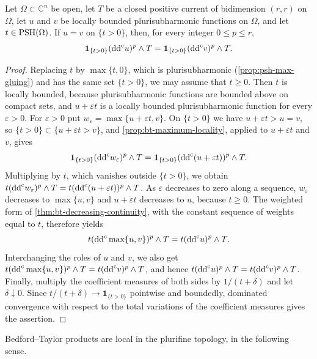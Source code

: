\begin{lemma}\label{lem:bt-superlevel-locality}
Let $\Omega\subset\mathbb C^n$ be open, let $T$ be a closed positive current of bidimension $(r,r)$ on $\Omega$, let $u$ and $v$ be locally bounded plurisubharmonic functions on $\Omega$, and let $t\in\mathrm{PSH}(\Omega)$. If $u=v$ on $\{t>0\}$, then, for every integer $0\le p\le r$,
\[
 \mathbf1_{\{t>0\}}(\mathrm{dd}^{\mathrm{c}} u)^p\wedge T
       =\mathbf1_{\{t>0\}}(\mathrm{dd}^{\mathrm{c}} v)^p\wedge T.
\]
\end{lemma}
\begin{proof}
Replacing $t$ by $\max\{t,0\}$, which is plurisubharmonic (\cref{prop:psh-max-gluing}) and has the same set $\{t>0\}$, we may assume that $t\ge0$. Then $t$ is locally bounded, because plurisubharmonic functions are bounded above on compact sets, and $u+\varepsilon t$ is a locally bounded plurisubharmonic function for every $\varepsilon>0$. For $\varepsilon>0$ put $w_\varepsilon=\max\{u+\varepsilon t,v\}$. On $\{t>0\}$ we have $u+\varepsilon t>u=v$, so $\{t>0\}\subset\{u+\varepsilon t>v\}$, and \cref{prop:bt-maximum-locality}, applied to $u+\varepsilon t$ and $v$, gives
\[
 \mathbf1_{\{t>0\}}(\mathrm{dd}^{\mathrm{c}} w_\varepsilon)^p\wedge T=\mathbf1_{\{t>0\}}(\mathrm{dd}^{\mathrm{c}}(u+\varepsilon t))^p\wedge T.
\]
Multiplying by $t$, which vanishes outside $\{t>0\}$, we obtain $t(\mathrm{dd}^{\mathrm{c}} w_\varepsilon)^p\wedge T=t(\mathrm{dd}^{\mathrm{c}}(u+\varepsilon t))^p\wedge T$. As $\varepsilon$ decreases to zero along a sequence, $w_\varepsilon$ decreases to $\max\{u,v\}$ and $u+\varepsilon t$ decreases to $u$, because $t\ge0$. The weighted form of \cref{thm:bt-decreasing-continuity}, with the constant sequence of weights equal to $t$, therefore yields
\[
 t(\mathrm{dd}^{\mathrm{c}}\max\{u,v\})^p\wedge T=t(\mathrm{dd}^{\mathrm{c}} u)^p\wedge T.
\]
Interchanging the roles of $u$ and $v$, we also get $t(\mathrm{dd}^{\mathrm{c}}\max\{u,v\})^p\wedge T=t(\mathrm{dd}^{\mathrm{c}} v)^p\wedge T$, and hence $t(\mathrm{dd}^{\mathrm{c}} u)^p\wedge T=t(\mathrm{dd}^{\mathrm{c}} v)^p\wedge T$. Finally, multiply the coefficient measures of both sides by $1/(t+\delta)$ and let $\delta\downarrow0$. Since $t/(t+\delta)\to\mathbf1_{\{t>0\}}$ pointwise and boundedly, dominated convergence with respect to the total variations of the coefficient measures gives the assertion.
\end{proof}

Bedford--Taylor products are local in the plurifine topology, in the following sense.

